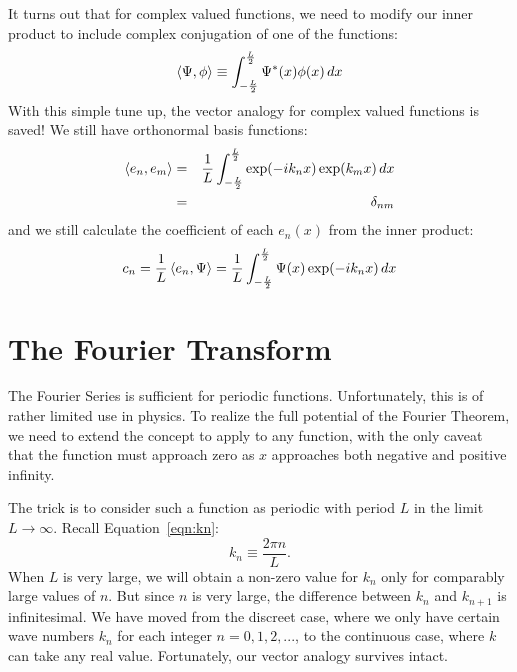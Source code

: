 \documentclass[12pt]{article}
\begin{document}
It turns out that for complex valued functions, we need to modify our inner product to include complex conjugation of one of the functions:
\begin{equation}
\braket{\Psi, \phi} \equiv \int_{-\frac{L}{2}}^{\frac{L}{2}} \Psi^*(x) \phi(x) \, dx
\end{equation}
With this simple tune up, the vector analogy for complex valued functions is saved!   We still have orthonormal basis functions:
\begin{eqnarray}
\braket{e_n, e_m} &=& \frac{1}{L} \int_{-\frac{L}{2}}^{\frac{L}{2}}  \exp(-i k_n x) \exp(k_m x) \, dx \nonumber \\
&=& \delta_{nm} \label{eqn:exportho}
\end{eqnarray}
and we still calculate the coefficient of each $e_n(x)$ from the inner product:
\begin{equation}
c_n = \frac{1}{L} \braket{e_n, \Psi} = \frac{1}{L} \int_{-\frac{L}{2}}^{\frac{L}{2}}  \Psi(x) \exp(-i k_n x) \, dx
\end{equation}

\section{The Fourier Transform}

The Fourier Series is sufficient for periodic functions.  Unfortunately, this is of rather limited use in physics.  To realize the full potential of the Fourier Theorem, we need to extend the concept to apply to any function, with the only caveat that the function must approach zero as $x$ approaches both negative and positive infinity.

The trick is to consider such a function as periodic with period $L$ in the limit $L \to \infty$.  Recall Equation~\ref{eqn:kn}:
\begin{equation*}
k_n \equiv \frac{2 \pi n}{L}.
\end{equation*}
When $L$ is very large, we will obtain a non-zero value for $k_n$ only for comparably large values of $n$.  But since $n$ is very large, the difference between $k_n$ and $k_{n+1}$ is infinitesimal.  We have moved from the discreet case, where we only have certain wave numbers $k_n$ for each integer $n=0,1,2,...$, to the continuous case, where $k$ can take any real value.  Fortunately, our vector analogy survives intact.
\end{document}
